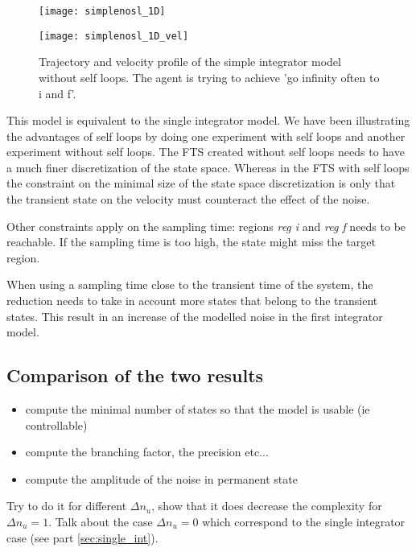 \begin{figure}[!ht]
	\begin{minipage}[b]{0.5\textwidth}
  		\centering
  		\texttt{[image: simplenosl\_1D]}
	  	\label{simplenosl_1D}
  \end{minipage}
	\begin{minipage}[b]{0.5\textwidth}
  		\centering
  		\texttt{[image: simplenosl\_1D\_vel]}
	  	\label{simplenosl_1D_vel}
  \end{minipage}
  \caption{Trajectory and velocity profile of the simple integrator model without self loops. The agent is trying to achieve 'go infinity often to i and f'.}
\end{figure}


This model is equivalent to the single integrator model.
We have been illustrating the advantages of self loops by doing one experiment with self loops and another experiment without self loops.
The FTS created without self loops needs to have a much finer discretization of the state space.
Whereas in the FTS with self loops the constraint on the minimal size of the state space discretization is only that the transient state on the velocity must counteract the effect of the noise.

\newcommand{\reg}[1]{\textit{reg #1}}
Other constraints apply on the sampling time: regions \reg{i} and \reg{f} needs to be reachable. If the sampling time is too high, the state might miss the target region.

When using a sampling time close to the transient time of the system, the reduction needs to take in account more states that belong to the transient states. This result in an increase of the modelled noise in the first integrator model.

\subsection{Comparison of the two results}
\begin{itemize}
\item compute the minimal number of states so that the model is usable (ie controllable)
\item compute the branching factor, the precision etc...
\item compute the amplitude of the noise in permanent state
\end{itemize}

Try to do it for different $\Delta n_u$, show that it does decrease the complexity for $\Delta n_u = 1$. Talk about the case $\Delta n_u = 0$ which correspond to the single integrator case (see part \ref{sec:single_int}).

